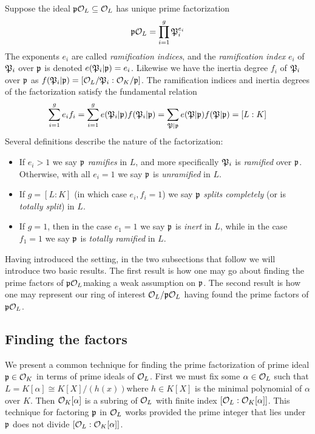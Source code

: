 Suppose the ideal $\mathfrak{p}\mathcal{O}_L\subseteq\mathcal{O}_L$ has unique prime factorization
\begin{equation}
    \mathfrak{p}\mathcal{O}_L = \prod_{i=1}^g \mathfrak{P}_i^{e_i}
\end{equation}
The exponents $e_i$ are called \emph{ramification indices}, and the \emph{ramification index} $e_i$ of $\mathfrak{P}_i$ over $\mathfrak{p}$ is denoted $e(\mathfrak{P}_i|\mathfrak{p})=e_i$.
Likewise we have the inertia degree $f_i$ of $\mathfrak{P}_i$ over $\mathfrak{p}$ as $f(\mathfrak{P}_i|\mathfrak{p})=[\mathcal{O}_L/\mathfrak{P}_i:\mathcal{O}_K/\mathfrak{p}]$.
The ramification indices and inertia degrees of the factorization satisfy the fundamental relation
\begin{equation}
    \sum_{i=1}^g e_if_i
    = \sum_{i=1}^g e(\mathfrak{P}_i|\mathfrak{p})f(\mathfrak{P}_i|\mathfrak{p})
    = \sum_{\mathfrak{P}|\mathfrak{p}} e(\mathfrak{P}|\mathfrak{p})f(\mathfrak{P}|\mathfrak{p})
    = [L:K]
\end{equation}
Several definitions describe the nature of the factorization:
\begin{itemize}
    \item
    If $e_i > 1$ we say $\mathfrak{p}$ \emph{ramifies} in $L$, and more specifically $\mathfrak{P}_i$ is \emph{ramified} over $\mathfrak{p}$.
    Otherwise, with all $e_i=1$ we say $\mathfrak{p}$ is \emph{unramified} in $L$.
    \item
    If $g=[L:K]$ (in which case $e_i,f_i=1$) we say $\mathfrak{p}$ \emph{splits completely} (or is \emph{totally split}) in $L$.   
    \item
    If $g=1$, then in the case $e_1=1$ we say $\mathfrak{p}$ is \emph{inert} in $L$, while in the case $f_1=1$ we say $\mathfrak{p}$ is \emph{totally ramified} in $L$.
\end{itemize}

Having introduced the setting, in the two subsections that follow we will introduce two basic results.
The first result is how one may go about finding the prime factors of $\mathfrak{p}\mathcal{O}_L$making a weak assumption on $\mathfrak{p}$.
The second result is how one may represent our ring of interest $\mathcal{O}_L/\mathfrak{p}\mathcal{O}_L$ having found the prime factors of $\mathfrak{p}\mathcal{O}_L$.


\subsection{Finding the factors}

We present a common technique for finding the prime factorization of prime ideal $\mathfrak{p}\in\mathcal{O}_K$ in terms of prime ideals of $\mathcal{O}_L$.
First we must fix some $\alpha\in\mathcal{O}_L$ such that $L=K[\alpha]\cong K[X]/(h(x))$where $h\in K[X]$ is the minimal polynomial of $\alpha$ over $K$.
Then $\mathcal{O}_K[\alpha]$ is a subring of $\mathcal{O}_L$ with finite index $[\mathcal{O}_L:\mathcal{O}_K[\alpha]]$.
This technique for factoring $\mathfrak{p}$  in $\mathcal{O}_L$ works provided the prime integer that lies under $\mathfrak{p}$ does not divide $[\mathcal{O}_L:\mathcal{O}_K[\alpha]]$.

